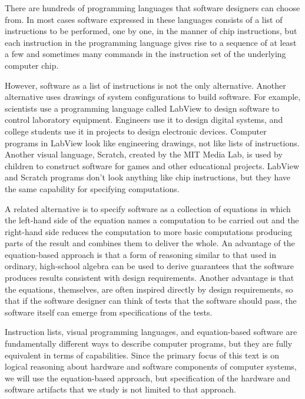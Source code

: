 There are hundreds of programming languages
that software designers can choose from.
In most cases software expressed in these languages consists
of a list of instructions to be performed, one by one,
in the manner of chip instructions,
but each instruction in the programming language gives
rise to a sequence of at least a few and sometimes many
commands in the instruction set of the underlying computer chip.

However, software as a list of instructions is
not the only alternative.
Another alternative uses drawings of
system configurations to build software.
For example, scientists use a programming language called 
LabView
to design software to control laboratory equipment.
Engineers use it to design digital systems,
and college students use it in projects to
design electronic devices.
Computer programs in LabView look like engineering drawings,
not like lists of instructions.
Another visual language,
Scratch, created by the MIT Media Lab,
is used by children to construct software for games
and other educational projects.
LabView and Scratch programs don't
look anything like chip instructions,
but they have the same capability for specifying computations.

A related alternative is to specify software as
a collection of equations in which
the left-hand side of the equation names a computation to be carried out
and the right-hand side reduces the computation to
more basic computations producing parts of the result
and combines them to deliver the whole.
An advantage of the equation-based approach
is that a form of reasoning similar to that used
in ordinary, high-school algebra can be used to derive
guarantees that the software produces results consistent
with design requirements.
Another advantage is that the equations, themselves,
are often inspired directly by design requirements,
so that if the software designer can think of tests
that the software should pass, the software itself
can emerge from specifications of the tests.

Instruction lists, visual programming languages, and equation-based
software are fundamentally different ways to describe computer programs, 
but they are fully equivalent in terms of capabilities.
Since the primary focus of this text is on logical reasoning
about hardware and software components of computer systems,
we will use the equation-based approach,
but specification of the hardware and software artifacts that we study
is not limited to that approach.

